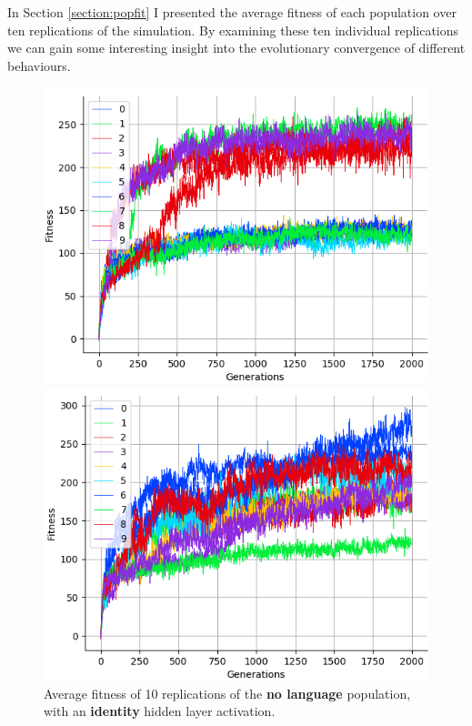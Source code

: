 \documentclass[12pt,a4paper]{report}
\begin{document}

In Section \ref{section:popfit} I presented the average fitness of each population over ten replications of the simulation. By examining these ten individual replications we can gain some interesting insight into the evolutionary convergence of different behaviours.

\begin{figure}[t]
   \centering
   \begin{minipage}{0.49\textwidth}
          \centering
          \captionsetup{width=.9\linewidth}
          \includegraphics[width=1.\linewidth]{results/ten-none-identity.png}
          \caption{Average fitness of 10 replications of the {\bf no language} population, with an {\bf identity} hidden layer activation.}
          \label{fig:ten-none-identity}
   \end{minipage}
   \begin{minipage}{0.49\textwidth}
          \centering
          \captionsetup{width=.9\linewidth}
          \includegraphics[width=1.\linewidth]{results/ten-none-relu.png}

\end{minipage}
\end{figure}
\end{document}
